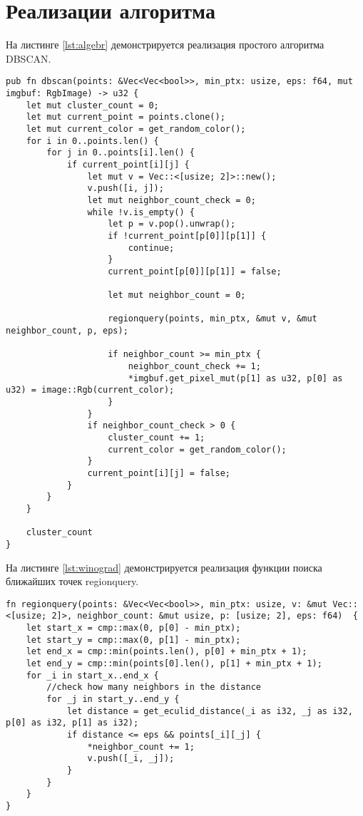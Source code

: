 \section{Реализации алгоритма}
На листинге \ref{lst:algebr} демонстрируется реализация простого алгоритма DBSCAN. 
\newpage

\captionsetup{singlelinecheck = false, justification=raggedright}
\begin{lstlisting}[label=lst:algebr,caption=Реализация простого алгоритма DBSCAN]
pub fn dbscan(points: &Vec<Vec<bool>>, min_ptx: usize, eps: f64, mut imgbuf: RgbImage) -> u32 {
	let mut cluster_count = 0;
	let mut current_point = points.clone();
	let mut current_color = get_random_color();
	for i in 0..points.len() {
		for j in 0..points[i].len() {
			if current_point[i][j] {
				let mut v = Vec::<[usize; 2]>::new();
				v.push([i, j]);
				let mut neighbor_count_check = 0;
				while !v.is_empty() {
					let p = v.pop().unwrap();
					if !current_point[p[0]][p[1]] {
						continue;
					}
					current_point[p[0]][p[1]] = false;
					
					let mut neighbor_count = 0;
					
					regionquery(points, min_ptx, &mut v, &mut neighbor_count, p, eps);
					
					if neighbor_count >= min_ptx {
						neighbor_count_check += 1;
						*imgbuf.get_pixel_mut(p[1] as u32, p[0] as u32) = image::Rgb(current_color);
					}
				}
				if neighbor_count_check > 0 {
					cluster_count += 1;
					current_color = get_random_color();
				}
				current_point[i][j] = false;
			}
		}
	}
	
	cluster_count
}
\end{lstlisting}


На листинге \ref{lst:winograd} демонстрируется реализация функции поиска ближайших точек regionquery.

\begin{lstlisting}[label=lst:winograd,caption=Реализация функции regionquery]
fn regionquery(points: &Vec<Vec<bool>>, min_ptx: usize, v: &mut Vec::<[usize; 2]>, neighbor_count: &mut usize, p: [usize; 2], eps: f64)  {
	let start_x = cmp::max(0, p[0] - min_ptx);
	let start_y = cmp::max(0, p[1] - min_ptx);
	let end_x = cmp::min(points.len(), p[0] + min_ptx + 1);
	let end_y = cmp::min(points[0].len(), p[1] + min_ptx + 1);
	for _i in start_x..end_x {
		//check how many neighbors in the distance
		for _j in start_y..end_y {
			let distance = get_eculid_distance(_i as i32, _j as i32, p[0] as i32, p[1] as i32);
			if distance <= eps && points[_i][_j] {
				*neighbor_count += 1;
				v.push([_i, _j]);
			}
		}
	}
}
\end{lstlisting}	

